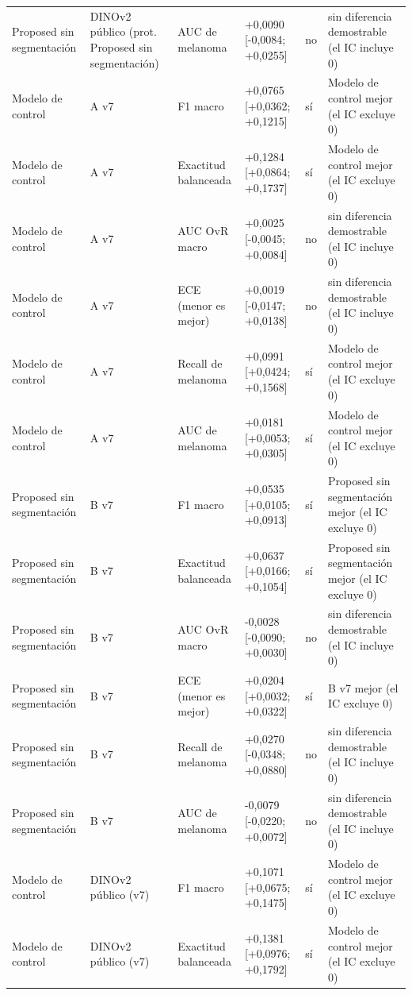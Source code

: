 \begin{longtable}{@{}llllll@{}}
Proposed sin segmentación & DINOv2 público (prot. Proposed sin segmentación) & AUC de melanoma & +0,0090 [-0,0084; +0,0255] & no & sin diferencia demostrable (el IC incluye 0) \\
Modelo de control & A v7 & F1 macro & +0,0765 [+0,0362; +0,1215] & sí & Modelo de control mejor (el IC excluye 0) \\
Modelo de control & A v7 & Exactitud balanceada & +0,1284 [+0,0864; +0,1737] & sí & Modelo de control mejor (el IC excluye 0) \\
Modelo de control & A v7 & AUC OvR macro & +0,0025 [-0,0045; +0,0084] & no & sin diferencia demostrable (el IC incluye 0) \\
Modelo de control & A v7 & ECE (menor es mejor) & +0,0019 [-0,0147; +0,0138] & no & sin diferencia demostrable (el IC incluye 0) \\
Modelo de control & A v7 & Recall de melanoma & +0,0991 [+0,0424; +0,1568] & sí & Modelo de control mejor (el IC excluye 0) \\
Modelo de control & A v7 & AUC de melanoma & +0,0181 [+0,0053; +0,0305] & sí & Modelo de control mejor (el IC excluye 0) \\
Proposed sin segmentación & B v7 & F1 macro & +0,0535 [+0,0105; +0,0913] & sí & Proposed sin segmentación mejor (el IC excluye 0) \\
Proposed sin segmentación & B v7 & Exactitud balanceada & +0,0637 [+0,0166; +0,1054] & sí & Proposed sin segmentación mejor (el IC excluye 0) \\
Proposed sin segmentación & B v7 & AUC OvR macro & -0,0028 [-0,0090; +0,0030] & no & sin diferencia demostrable (el IC incluye 0) \\
Proposed sin segmentación & B v7 & ECE (menor es mejor) & +0,0204 [+0,0032; +0,0322] & sí & B v7 mejor (el IC excluye 0) \\
Proposed sin segmentación & B v7 & Recall de melanoma & +0,0270 [-0,0348; +0,0880] & no & sin diferencia demostrable (el IC incluye 0) \\
Proposed sin segmentación & B v7 & AUC de melanoma & -0,0079 [-0,0220; +0,0072] & no & sin diferencia demostrable (el IC incluye 0) \\
Modelo de control & DINOv2 público (v7) & F1 macro & +0,1071 [+0,0675; +0,1475] & sí & Modelo de control mejor (el IC excluye 0) \\
Modelo de control & DINOv2 público (v7) & Exactitud balanceada & +0,1381 [+0,0976; +0,1792] & sí & Modelo de control mejor (el IC excluye 0) \\

\end{longtable}
